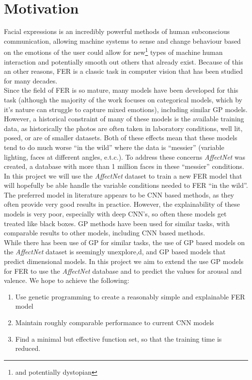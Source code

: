 \documentclass[7.5pt,twocolumn]{article}
\begin{document}
	\section{Motivation}
	Facial expressions is an incredibly powerful methods of human subconscious communication, allowing machine systems to sense and change behaviour based on the emotions of the user could allow for new\footnote{and potentially dystopian} types of machine human interaction and potentially smooth out others that already exist. Because of this an other reasons, FER is a classic task in computer vision that has been studied for many decades\supercite{history}.\\
	Since the field of FER is so mature, many models have been developed for this task (although the majority of the work focuses on categorical models, which by it's nature can struggle to capture mixed emotions), including similar GP models\supercite{exampleGP}.
	However, a historical constraint of many of these models is the available training data, as historically the photos are often taken in laboratory conditions, well lit, posed, or are of smaller datasets\supercite{Mollahosseini_2019}. Both of these effects mean that these models tend to do much worse ``in the wild'' where the data is ``messier'' (variable lighting, faces at different angles, e.t.c.). To address these concerns \emph{AffectNet}\supercite{Mollahosseini_2019} was created, a database with more than 1 million faces in these ``messier'' conditions. In this project we will use the \emph{AffectNet} dataset to train a new FER model that will hopefully be able handle the variable conditions needed to FER ``in the wild''.\\
	
	The preferred model in literature appears to be CNN based methods\supercite{survey}, as they often provide very good results in practice. However, the explainability of these models is very poor, especially with deep CNN's, so often these models get treated like black boxes. GP methods have been used\supercite{JAFFE_GP} for similar tasks, with comparable results to other models, including CNN based methods.\\
	While there has been use of GP for similar tasks, the use of GP based models on the \emph{AffectNet} dataset is seemingly unexplore,d, and GP based models that predict dimensional models. In this project we aim to extend the use GP models for FER to use the \emph{AffectNet} database and to predict the values for arousal and valence. We hope to achieve the following:
	\begin{enumerate}
		\item Use genetic programming to create a reasonably simple and explainable FER model
		\item Maintain roughly comparable performance to current CNN models
		\item Find a minimal but effective function set, so that the training time is reduced.
	\end{enumerate}
\end{document}
